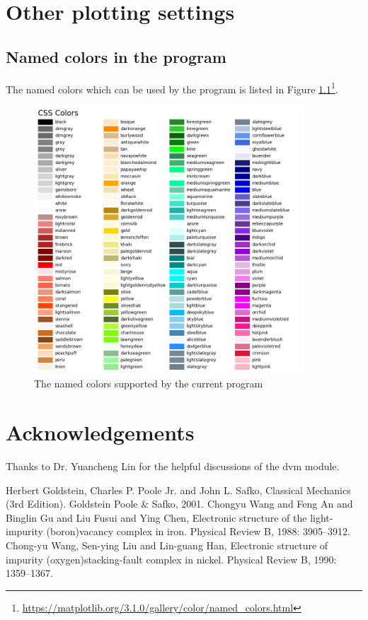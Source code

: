 \documentclass[12pt]{book}
\begin{document}
\newpage
\appendix

\chapter{Other plotting settings}


\section{\label{sec:supp}Named colors in the program}
The named colors which can be used by the program is listed in Figure \ref{fig:named_colors}\footnote{\url{https://matplotlib.org/3.1.0/gallery/color/named_colors.html}}.
\begin{figure}[htbp]
\centering
\includegraphics[width=0.9\textwidth]{named_colors.pdf}
\caption{The named colors supported by the current program}
\label{fig:named_colors}
\end{figure}

\chapter*{Acknowledgements}
Thanks to Dr. Yuancheng Lin for the helpful discussions of the dvm module.

\begin{thebibliography}{99}
 Herbert Goldstein, Charles P. Poole Jr. and John L. Safko, Classical Mechanics (3rd Edition). Goldstein Poole \& Safko, 2001.
 Chongyu Wang and Feng An and Binglin Gu and Liu Fusui and Ying Chen, Electronic structure of the light-impurity (boron){\textendash}vacancy complex in iron. Physical Review B, 1988: 3905--3912.
 Chong-yu Wang, Sen-ying Liu and Lin-guang Han, Electronic structure of impurity (oxygen){\textendash}stacking-fault complex in nickel. Physical Review B, 1990: 1359--1367.
\end{thebibliography}
\end{document}
